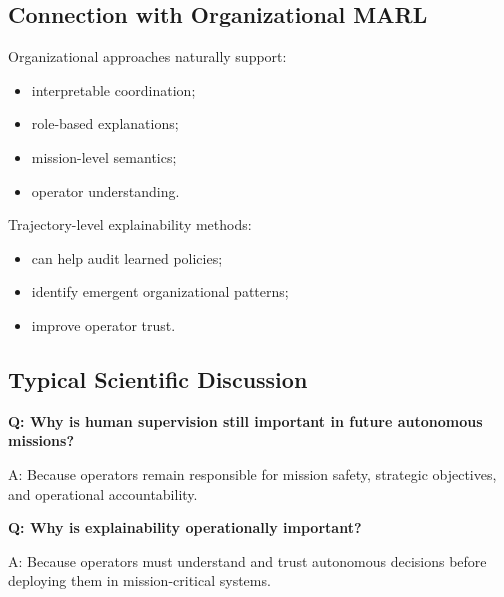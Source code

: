 \documentclass[10pt,a4paper,twocolumn]{article}
\begin{document}

\subsection{Connection with Organizational MARL}

Organizational approaches naturally support:
\begin{itemize}
    \item interpretable coordination;
    \item role-based explanations;
    \item mission-level semantics;
    \item operator understanding.
\end{itemize}

Trajectory-level explainability methods:
\begin{itemize}
    \item can help audit learned policies;
    \item identify emergent organizational patterns;
    \item improve operator trust.
\end{itemize}


\subsection{Typical Scientific Discussion}

\begin{questionbox}
    \textbf{Q: Why is human supervision still important in future autonomous missions?}

    A: Because operators remain responsible for mission safety, strategic objectives, and operational accountability.
\end{questionbox}

\begin{questionbox}
    \textbf{Q: Why is explainability operationally important?}

    A: Because operators must understand and trust autonomous decisions before deploying them in mission-critical systems.
\end{questionbox}
\end{document}
